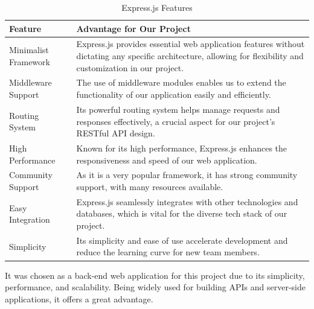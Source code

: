 \begin{table}[H]
    \centering
    \begin{tabularx}{\textwidth}{|l|X|}
        \hline
        \textbf{Feature}     & \textbf{Advantage for Our Project}                                                                                                                              \\
        \hline
        Minimalist Framework & Express.js provides essential web application features without dictating any specific architecture, allowing for flexibility and customization in our project.  \\
        \hline
        Middleware Support   & The use of middleware modules enables us to extend the functionality of our application easily and efficiently.                                                 \\
        \hline
        Routing System       & Its powerful routing system helps manage requests and responses effectively, a crucial aspect for our project's RESTful API design.                             \\
        \hline
        High Performance     & Known for its high performance, Express.js enhances the responsiveness and speed of our web application.                                                        \\
        \hline
        Community Support    & As it is a very popular framework, it has strong community support, with many resources available.\\
        \hline
        Easy Integration     & Express.js seamlessly integrates with other technologies and databases, which is vital for the diverse tech stack of our project.                               \\
        \hline
        Simplicity           & Its simplicity and ease of use accelerate development and reduce the learning curve for new team members.                                                       \\
        \hline
    \end{tabularx}
    \caption{Express.js Features}
    \label{tab:expressJS}
    
\end{table}

It was chosen as a back-end web application for this project due to its simplicity, performance, and scalability. Being widely used for building APIs and server-side applications, it offers a great
advantage.


